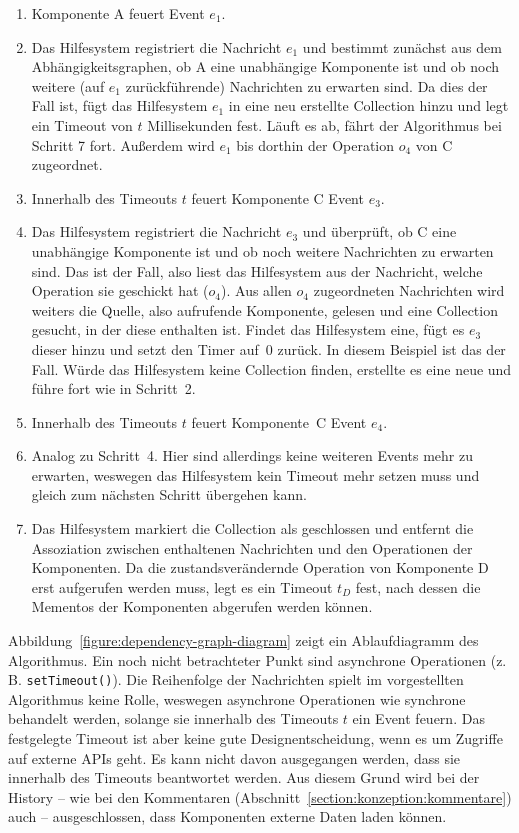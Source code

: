 \documentclass[
	headsepline,
	footsepline,
	fontsize=12pt,
	bibliography=totoc
]{scrbook}
\begin{document}
\begin{enumerate}
	\item Komponente A feuert Event $e_1$.
	\item Das Hilfesystem registriert die Nachricht $e_1$ und bestimmt zunächst aus dem Abhängigkeitsgraphen, ob A eine unabhängige Komponente ist und ob noch weitere (auf $e_1$ zurückführende) Nachrichten zu erwarten sind. Da dies der Fall ist, fügt das Hilfesystem $e_1$ in eine neu erstellte Collection hinzu und legt ein Timeout von $t$ Millisekunden fest. Läuft es ab, fährt der Algorithmus bei Schritt 7 fort. Außerdem wird $e_1$ bis dorthin der Operation $o_4$ von C zugeordnet.
	\item Innerhalb des Timeouts $t$ feuert Komponente C Event $e_3$.
	\item Das Hilfesystem registriert die Nachricht $e_3$ und überprüft, ob C eine unabhängige Komponente ist und ob noch weitere Nachrichten zu erwarten sind. Das ist der Fall, also liest das Hilfesystem aus der Nachricht, welche Operation sie geschickt hat ($o_4$). Aus allen $o_4$ zugeordneten Nachrichten wird weiters die Quelle, also aufrufende Komponente, gelesen und eine Collection gesucht, in der diese enthalten ist. Findet das Hilfesystem eine, fügt es $e_3$ dieser hinzu und setzt den Timer auf~0 zurück. In diesem Beispiel ist das der Fall. Würde das Hilfesystem keine Collection finden, erstellte es eine neue und führe fort wie in Schritt~2.
	\item Innerhalb des Timeouts $t$ feuert Komponente~C Event $e_4$.
	\item Analog zu Schritt~4. Hier sind allerdings keine weiteren Events mehr zu erwarten, weswegen das Hilfesystem kein Timeout mehr setzen muss und gleich zum nächsten Schritt übergehen kann.
	\item Das Hilfesystem markiert die Collection als geschlossen und entfernt die Assoziation zwischen enthaltenen Nachrichten und den Operationen der Komponenten. Da die zustandsverändernde Operation von Komponente D erst aufgerufen werden muss, legt es ein Timeout $t_D$ fest, nach dessen die Mementos der Komponenten abgerufen werden können.
\end{enumerate}


Abbildung~\ref{figure:dependency-graph-diagram} zeigt ein Ablaufdiagramm des Algorithmus. Ein noch nicht betrachteter Punkt sind asynchrone Operationen (z.\,B. \texttt{setTimeout()}). Die Reihenfolge der Nachrichten spielt im vorgestellten Algorithmus keine Rolle, weswegen asynchrone Operationen wie synchrone behandelt werden, solange sie innerhalb des Timeouts $t$ ein Event feuern. Das festgelegte Timeout ist aber keine gute Designentscheidung, wenn es um Zugriffe auf externe APIs geht. Es kann nicht davon ausgegangen werden, dass sie innerhalb des Timeouts beantwortet werden. Aus diesem Grund wird bei der History -- wie bei den Kommentaren (Abschnitt~\ref{section:konzeption:kommentare}) auch -- ausgeschlossen, dass Komponenten externe Daten laden können.
\end{document}
